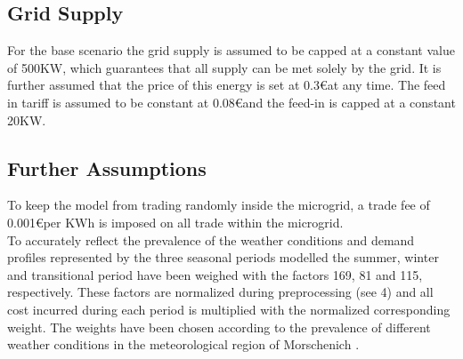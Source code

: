 \documentclass[
	11pt,								%
	DIV10,								%
	a4paper,         					%
	oneside,							%
	headheight=20pt,					%
	footheight=20pt,					%
    parskip=full,						%
    listof=totoc,						%
	bibliography=totoc,					%
	index=totoc,						%
]{scrartcl}
\begin{document}
\subsection{Grid Supply}
For the base scenario the grid supply is assumed to be capped at a constant value of 500KW, which guarantees that all supply can be met solely by the grid. It is further assumed that the price of this energy is set at 0.3\euro at any time\cite{Monitoringbericht20182018}. The feed in tariff is assumed to be constant at 0.08\euro and the feed-in is capped at a constant 20KW.

\subsection{Further Assumptions}
To keep the model from trading randomly inside the microgrid, a trade fee of 0.001\euro per KWh is imposed on all trade within the microgrid.\\
To accurately reflect the prevalence of the weather conditions and demand profiles represented by the three seasonal periods modelled the summer, winter and transitional period have been weighed with the factors 169, 81 and 115, respectively. These factors are normalized during preprocessing (see 4) and all cost incurred during each period is multiplied with the normalized corresponding weight. The weights have been chosen according to the prevalence of different weather conditions in the meteorological region of Morschenich \cite{ReferenzlastprofileUndMehrfamilien2008}.
\end{document}
